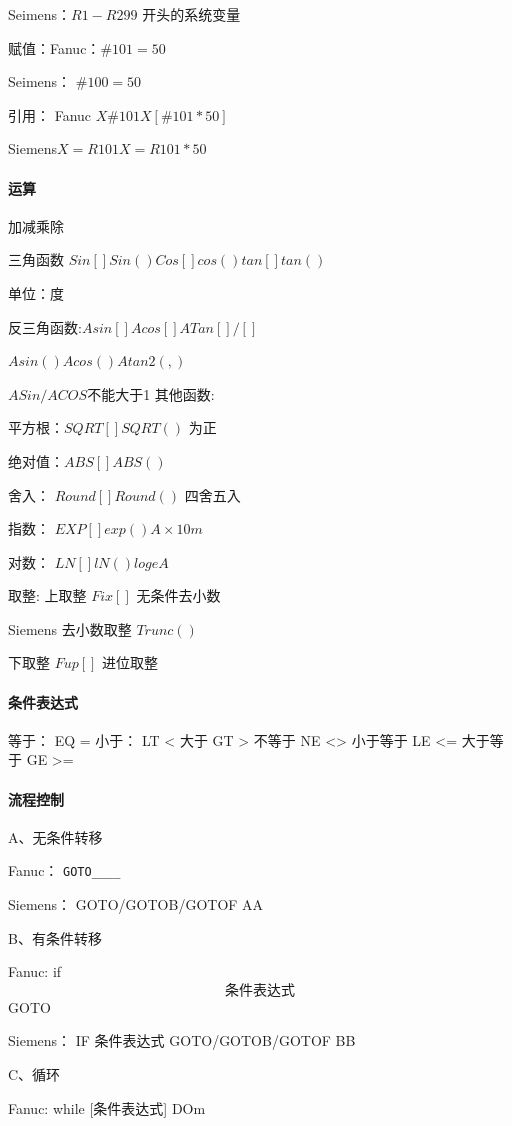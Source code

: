 Seimens：$ R1-R299 $     开头的系统变量

赋值：Fanuc：$\#101=50$

Seimens： $\#100=50$

引用： Fanuc  $ X\#101   X[\#101*50]$

Siemens$ X=R101  X=R101*50$

\paragraph{运算}

加减乘除

三角函数  $Sin[] Sin() Cos[] cos() tan[] tan()$

单位：度

反三角函数:$ Asin[] Acos[] ATan[]/[]$

$Asin() Acos() Atan2( , )$

$ASin/ACOS $不能大于1
其他函数:

平方根：$SQRT[]  SQRT() $   为正

绝对值：$ABS[]   ABS()$

舍入： $  Round[]  Round() $ 四舍五入

指数：   $EXP[]  exp()   A×10m$

对数：   $LN[]   lN()    logeA$

取整:    上取整  $ Fix[]$ 无条件去小数

Siemens 去小数取整   $Trunc()$

下取整   $Fup[]$  进位取整   
            
\paragraph{条件表达式}
等于：     EQ      =
小于：     LT      <
大于       GT      >
不等于     NE      <>
小于等于   LE      <=
大于等于   GE      >=
\paragraph{流程控制}
A、无条件转移

Fanuc： \verb|GOTO____|

Siemens： GOTO/GOTOB/GOTOF  AA

B、有条件转移

Fanuc: if \[条件表达式\] GOTO

Siemens： IF  条件表达式  GOTO/GOTOB/GOTOF BB

C、循环

Fanuc:  while [条件表达式] DOm

